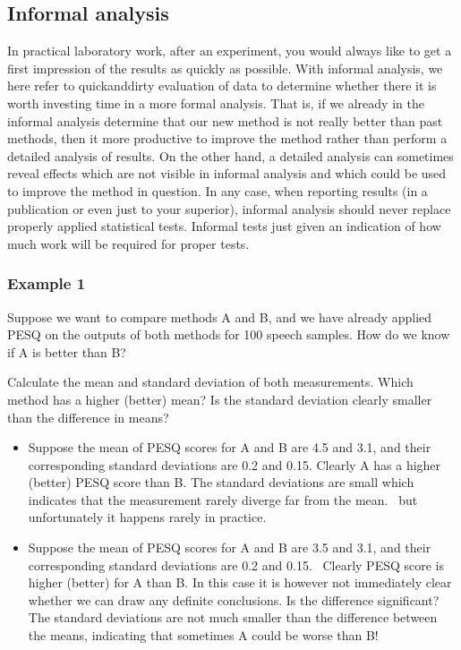 \documentclass[letterpaper,10pt,english]{jupyterBook}
\begin{document}
\subsection{Informal analysis}
\label{\detokenize{Evaluation/Analysis_of_evaluation_results:informal-analysis}}
\sphinxAtStartPar
In practical laboratory work, after an experiment, you would always like
to get a first impression of the results as quickly as possible. With
informal analysis, we here refer to quick\sphinxhyphen{}and\sphinxhyphen{}dirty evaluation of data
to determine whether there it is worth investing time in a more formal
analysis. That is, if we already in the informal analysis determine that
our new method is not really better than past methods, then it more
productive to improve the method rather than perform a detailed analysis
of results. On the other hand, a detailed analysis can sometimes reveal
effects which are not visible in informal analysis and which could be
used to improve the method in question. In any case, when reporting
results (in a publication or even just to your superior), informal
analysis should never replace properly applied statistical tests.
Informal tests just given an indication of how much work will be
required for proper tests.


\subsubsection{Example 1}
\label{\detokenize{Evaluation/Analysis_of_evaluation_results:example-1}}
\sphinxAtStartPar
Suppose we want to compare methods A and B, and we have already applied
PESQ on the outputs of both methods for 100 speech samples. How do we
know if A is better than B?

\sphinxAtStartPar
{} Calculate the mean and standard deviation of both
measurements. Which method has a higher (better) mean? Is the standard
deviation clearly smaller than the difference in means?
\begin{itemize}
\item {} 
\sphinxAtStartPar
Suppose the mean of PESQ scores for A and B are 4.5 and 3.1, and
their corresponding standard deviations are 0.2 and 0.15. Clearly A
has a higher (better) PESQ score than B. The standard deviations are
small which indicates that the measurement rarely diverge far from
the mean.  but unfortunately it
happens rarely in practice.

\item {} 
\sphinxAtStartPar
Suppose the mean of PESQ scores for A and B are 3.5 and 3.1, and
their corresponding standard deviations are 0.2 and 0.15.  Clearly
 PESQ score is higher (better) for A than B. In this case
it is however not immediately clear whether we can draw any definite
conclusions. Is the difference significant? The standard deviations
are not much smaller than the difference between the means,
indicating that sometimes A could be worse than B! 

\end{itemize}
\end{document}
